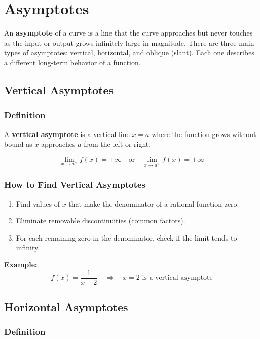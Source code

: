 \section{Asymptotes}

An \textbf{asymptote} of a curve is a line that the curve approaches but never touches as the input or output grows infinitely large in magnitude. There are three main types of asymptotes: vertical, horizontal, and oblique (slant). Each one describes a different long-term behavior of a function.

\subsection{Vertical Asymptotes}

\subsubsection*{Definition}

A \textbf{vertical asymptote} is a vertical line \(x = a\) where the function grows without bound as \(x\) approaches \(a\) from the left or right.

\[
\lim_{x \to a^-} f(x) = \pm \infty \quad \text{or} \quad \lim_{x \to a^+} f(x) = \pm \infty
\]

\subsubsection*{How to Find Vertical Asymptotes}

\begin{enumerate}
    \item Find values of \(x\) that make the denominator of a rational function zero.
    \item Eliminate removable discontinuities (common factors).
    \item For each remaining zero in the denominator, check if the limit tends to infinity.
\end{enumerate}

\textbf{Example:}
\[
f(x) = \frac{1}{x - 2} \quad \Rightarrow \quad x = 2 \text{ is a vertical asymptote}
\]

\subsection{Horizontal Asymptotes}

\subsubsection*{Definition}

